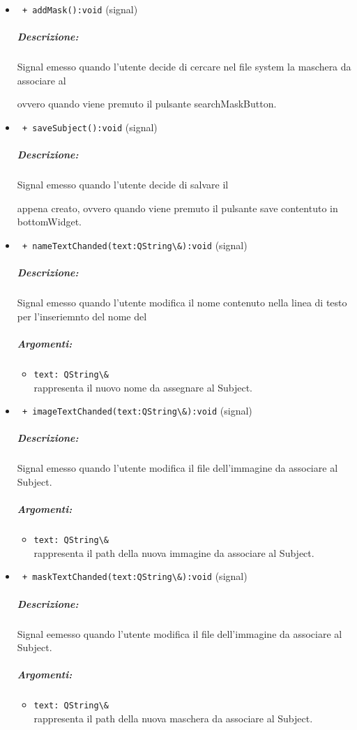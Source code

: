 \begin{itemize}
\item \color{blue}\verb! + addMask():void! (signal)
\color{black} 
\subparagraph{Descrizione: }
Signal\g{} emesso quando l'utente decide di cercare nel file system la maschera da associare al \subject{} ovvero quando viene premuto il pulsante searchMaskButton.

\item \color{blue}\verb! + saveSubject():void! (signal)
\color{black} 
\subparagraph{Descrizione: }
Signal\g{} emesso quando l'utente decide di salvare il \subject{} appena creato, ovvero quando viene premuto il pulsante save contentuto in bottomWidget.

\item \color{blue}\verb! + nameTextChanded(text:QString\&):void! (signal)
\color{black} 
\subparagraph{Descrizione: }
Signal\g{} emesso quando l'utente modifica il nome contenuto nella linea di testo per l'inseriemnto del nome del \subject.
\subparagraph{Argomenti:}
\begin{itemize}
\item \color{RoyalPurple} \verb!text: QString\& !\\ rappresenta il nuovo nome da assegnare al Subject\g{}. 
\end{itemize}

\item \color{blue}\verb! + imageTextChanded(text:QString\&):void! (signal)
\color{black} 
\subparagraph{Descrizione: }
Signal\g{} emesso quando l'utente modifica il file dell'immagine da associare al Subject\g{}.
\subparagraph{Argomenti:}
\begin{itemize}
\item \color{RoyalPurple} \verb!text: QString\& !\\ rappresenta il path della nuova immagine da associare al Subject\g{}. 
\end{itemize}

\item \color{blue}\verb! + maskTextChanded(text:QString\&):void! (signal)
\color{black} 
\subparagraph{Descrizione: }
Signal\g{} eemesso quando l'utente modifica il file dell'immagine da associare al Subject\g{}.
\subparagraph{Argomenti:}
\begin{itemize}
\item \color{RoyalPurple}\verb!text: QString\& !\\ rappresenta il path della nuova maschera da associare al Subject\g{}. 
\end{itemize}

\end{itemize}
\color{black}
\pagebreak
%
